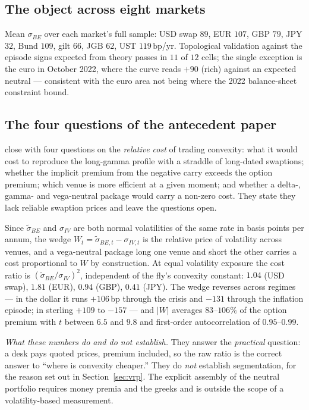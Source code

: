 \documentclass[11pt]{article}
\newcommand{\bp}{\,\mathrm{bp}}
\newcommand{\sBE}{\sigma_{BE}}
\begin{document}
\subsection{The object across eight markets}\label{sec:object}
Mean $\sBE$ over each market's full sample: USD swap $89$, EUR $107$, GBP $79$, JPY $32$, Bund $109$,
gilt $66$, JGB $62$, UST $119\bp$/yr. Topological validation against the episode signs expected from
theory passes in $11$ of $12$ cells; the single exception is the euro in October 2022, where the
curve reads $+90$ (rich) against an expected neutral --- consistent with the euro area not being where
the 2022 balance-sheet constraint bound.

\subsection{The four questions of the antecedent paper}\label{sec:fourq}
\citet{rr2021} close with four questions on the \emph{relative cost} of trading convexity: what it
would cost to reproduce the long-gamma profile with a straddle of long-dated swaptions; whether the
implicit premium from the negative carry exceeds the option premium; which venue is more efficient at
a given moment; and whether a delta-, gamma- and vega-neutral package would carry a non-zero cost.
They state they lack reliable swaption prices and leave the questions open.

Since $\tilde\sigma_{BE}$ and $\sigma_{IV}$ are both normal volatilities of the same rate in basis
points per annum, the wedge $W_t=\tilde\sigma_{BE,t}-\sigma_{IV,t}$ is the relative price of
volatility across venues, and a vega-neutral package long one venue and short the other carries a
cost proportional to $W$ by construction. At equal volatility exposure the cost ratio is
$(\tilde\sigma_{BE}/\sigma_{IV})^2$, independent of the fly's convexity constant: $1.04$ (USD swap),
$1.81$ (EUR), $0.94$ (GBP), $0.41$ (JPY). The wedge reverses across regimes --- in the dollar it runs
$+106$\,bp through the crisis and $-131$ through the inflation episode; in sterling $+109$ to $-157$
--- and $|W|$ averages $83$--$106\%$ of the option premium with $t$ between $6.5$ and $9.8$ and
first-order autocorrelation of $0.95$--$0.99$.

\emph{What these numbers do and do not establish.} They answer the \emph{practical} question: a desk
pays quoted prices, premium included, so the raw ratio is the correct answer to ``where is convexity
cheaper.'' They do \emph{not} establish segmentation, for the reason set out in
Section~\ref{sec:vrp}. The explicit assembly of the neutral portfolio requires money premia and the
greeks and is outside the scope of a volatility-based measurement.
\end{document}
